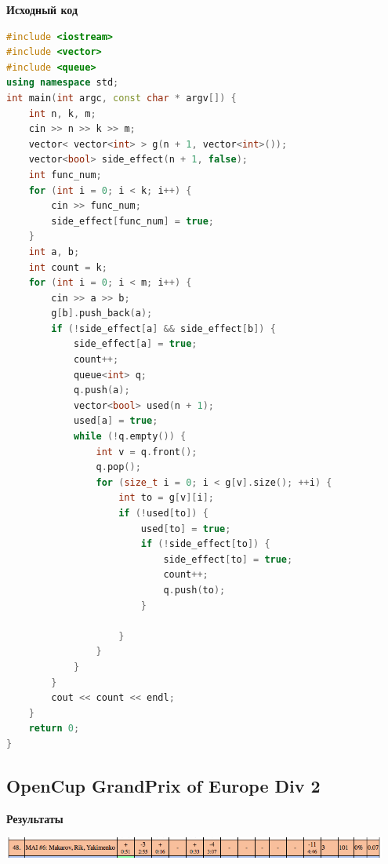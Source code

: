\documentclass[a4paper,12pt]{article}
\begin{document}
\newpage
\textbf{{\large Исходный код}} \\
\begin{lstlisting}[language=C++]
#include <iostream>
#include <vector>
#include <queue>
using namespace std;
int main(int argc, const char * argv[]) {
    int n, k, m;
    cin >> n >> k >> m;
    vector< vector<int> > g(n + 1, vector<int>());
    vector<bool> side_effect(n + 1, false);
    int func_num;
    for (int i = 0; i < k; i++) {
        cin >> func_num;
        side_effect[func_num] = true;
    }
    int a, b;
    int count = k;
    for (int i = 0; i < m; i++) {
        cin >> a >> b;
        g[b].push_back(a);
        if (!side_effect[a] && side_effect[b]) {
            side_effect[a] = true;
            count++;
            queue<int> q;
            q.push(a);
            vector<bool> used(n + 1);
            used[a] = true;
            while (!q.empty()) {
                int v = q.front();
                q.pop();
                for (size_t i = 0; i < g[v].size(); ++i) {
                    int to = g[v][i];
                    if (!used[to]) {
                        used[to] = true;
                        if (!side_effect[to]) {
                            side_effect[to] = true;
                            count++;
                            q.push(to);
                        }
                        
                    }
                }
            }
        }
        cout << count << endl;
    }
    return 0;
}
\end{lstlisting}








%
%
\newpage
\subsection{OpenCup GrandPrix of Europe Div 2}

\textbf{{\large Результаты}} \\
\begin{center}
\includegraphics[width=0.95\textwidth]{OC_Europe/result.png}\\ [1cm]
\end{center}
\end{document}
